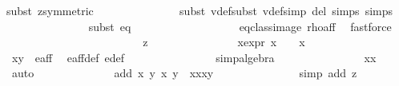 \begin{isabellebody}
{\isacharparenleft}subst\ z{}{\isacharbrackleft}symmetric{\isacharbrackright}{\isacharparenright}{\isacharplus}\isanewline
\ \ \ \ \ \ \ \ \ \ \ \ \ \ \isamarkupfalse%
{\isacharparenleft}subst\ v{}{\isacharunderscore}def{\isacharcomma}subst\ v{}{\isacharunderscore}def{\isacharcomma}simp\ del{\isacharcolon}\ {\isasymtau}{\isachardot}simps\ {\isasymrho}{\isachardot}simps{\isacharparenright}\isanewline
\ \ \ \ \ \ \ \ \ \ \ \ \ \ \isamarkupfalse%
{\isacharparenleft}subst\ eq{\isacharparenright}\ \ \ \isanewline
\ \ \ \ \ \ \ \ \ \ \ \ \ \ \isamarkupfalse%
\ eq{\isacharunderscore}class{\isacharunderscore}image\ rho{\isacharunderscore}aff\ \isamarkupfalse%
\ fastforce\isanewline
\ \ \ \ \ \ \ \ \ \ \isamarkupfalse%
\isanewline
\ \ \ \ \ \ \ \ \ \ \ \ \isamarkupfalse%
\ z{}\isanewline
\ \ \ \ \ \ \ \ \ \ \ \ \isamarkupfalse%
\ \isamarkupfalse%
\ x{\isacharunderscore}expr{\isacharcolon}\ {\isachardoublequoteopen}x\ {\isacharequal}\ {}\ {\isasymor}\ x\ {\isacharequal}\ {\isacharminus}{}{\isachardoublequoteclose}\isanewline
\ \ \ \ \ \ \ \ \ \ \ \ \ \ \isamarkupfalse%
\ {\isacartoucheopen}{\isacharparenleft}x{\isacharcomma}y{\isacharparenright}\ {\isasymin}\ e{\isacharunderscore}aff{\isacartoucheclose}\ \isamarkupfalse%
\ e{\isacharunderscore}aff{\isacharunderscore}def\ e{\isacharprime}{\isacharunderscore}def\ \isanewline
\ \ \ \ \ \ \ \ \ \ \ \ \ \ \isamarkupfalse%
{\isacharparenleft}simp{\isacharcomma}algebra{\isacharparenright}\isanewline
\ \ \ \ \ \ \ \ \ \ \ \ \isamarkupfalse%
\ \isamarkupfalse%
\ {\isachardoublequoteopen}x{\isacharasterisk}x\ {\isacharequal}\ {}{\isachardoublequoteclose}\ \isamarkupfalse%
\ auto\isanewline
\ \ \ \ \ \ \ \ \ \ \ \ \isamarkupfalse%
\ {\isachardoublequoteopen}add\ {\isacharparenleft}x{\isacharcomma}\ y{\isacharparenright}\ {\isacharparenleft}x{\isacharprime}{\isacharcomma}\ y{\isacharprime}{\isacharparenright}\ {\isacharequal}\ {\isacharparenleft}x{\isacharasterisk}x{\isacharprime}{\isacharcomma}x{\isacharasterisk}y{\isacharprime}{\isacharparenright}{\isachardoublequoteclose}\isanewline
\ \ \ \ \ \ \ \ \ \ \ \ \ \ \isamarkupfalse%
{\isacharparenleft}simp\ add{\isacharcolon}\ z{}{\isacharparenright}\isanewline
\ \ \ \ \ \ \ \ \ \ \ \ \isamarkupfalse%

\end{isabellebody}
